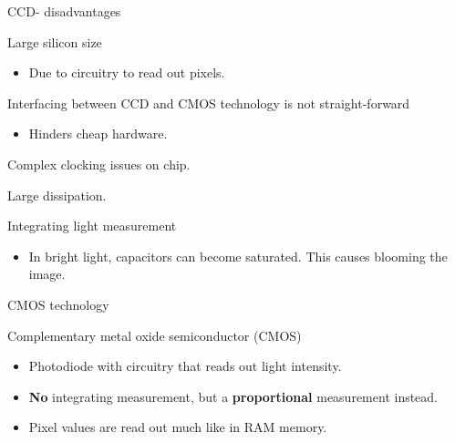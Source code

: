 \documentclass[compress]{beamer}
\providecommand{\tightlist}{%
  \setlength{\itemsep}{0pt}\setlength{\parskip}{0pt}}
\begin{document}
\begin{frame}{CCD- disadvantages}

Large silicon size

\begin{itemize}
\tightlist
\item
  Due to circuitry to read out pixels.
\end{itemize}

Interfacing between CCD and CMOS technology is not straight-forward

\begin{itemize}
\tightlist
\item
  Hinders cheap hardware.
\end{itemize}

Complex clocking issues on chip.

Large dissipation.

Integrating light measurement

\begin{itemize}
\tightlist
\item
  In bright light, capacitors can become saturated. This causes blooming
  the image.
\end{itemize}

\end{frame}

\begin{frame}{CMOS technology}

Complementary metal oxide semiconductor (CMOS)

\begin{itemize}
\tightlist
\item
  Photodiode with circuitry that reads out light intensity.
\item
  \textbf{No} integrating measurement, but a \textbf{proportional}
  measurement instead.
\item
  Pixel values are read out much like in RAM memory.
\end{itemize}

\end{frame}
\end{document}
